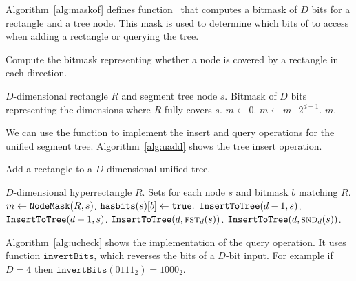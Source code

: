 \documentclass[english,gradu]{tktltiki2018}
\begin{document}
Algorithm~\ref{alg:maskof} defines function~\maskof{} that computes a bitmask of $D$ bits for a rectangle and a tree node.
This mask is used to determine which bits of  to access when adding a rectangle or querying the tree.

\begin{algorithm}
\caption{Compute the bitmask representing whether a node is covered by a rectangle in each direction.}\label{alg:maskof}
\begin{algorithmic}
\Require $D$-dimensional rectangle $R$ and segment tree node $s$.
\Output Bitmask of $D$ bits representing the dimensions where $R$ fully covers $s$.
	\State $m\gets 0$.
			\State $m\gets m\ |\ 2^{d-1}$.
		\EndIf
	\EndFor
	\State \Return $m$.
\EndProcedure
\end{algorithmic}
\end{algorithm}

We can use the \maskoff function to implement the insert and query operations for the unified segment tree.
Algorithm~\ref{alg:uadd} shows the tree insert operation.

\begin{algorithm}
\caption{Add a rectangle to a $D$-dimensional unified tree.}\label{alg:uadd}
\begin{algorithmic}
\Require $D$-dimensional hyperrectangle $R$.
\Ensure Sets  for each node $s$ and bitmask $b$ matching $R$.
		\State $m\gets\texttt{NodeMask}(R,s)$.
				\State $\texttt{hasbits}(s)[b]\gets\texttt{true}.$
			\EndIf
		\EndFor
		\State $\texttt{InsertToTree}(d-1,s)$.
		\State $\texttt{InsertToTree}(d-1,s)$.
		\State $\texttt{InsertToTree}(d,\textsc{fst}_{d}(s))$.
		\State $\texttt{InsertToTree}(d,\textsc{snd}_{d}(s))$.
	\EndIf
\EndProcedure
\end{algorithmic}
\end{algorithm}

Algorithm~\ref{alg:ucheck} shows the implementation of the query operation.
It uses function $\texttt{invertBits}$, which reverses the bits of a $D$-bit input.
For example if $D=4$ then $\texttt{invertBits}(0111_2)=1000_2$.
\end{document}
